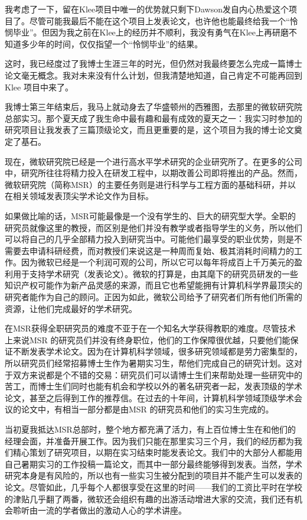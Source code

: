 \documentclass[letter,12pt]{book}
\begin{document}
\begin{CJK}{UTF8}{gbsn}
我考虑了一下，留在Klee项目中唯一的优势就只剩下Dawson发自内心热爱这个项目了。尽管可能我最后不能在这个项目上发表论文，也许他也能最终给我一个“怜悯毕业”。但因为我之前在Klee上的经历并不顺利，我没有勇气在Klee上再研磨不知道多少年的时间，仅仅指望一个“怜悯毕业”的结果。

这时，我已经度过了我博士生涯三年的时光，但仍然对我最终要怎么完成一篇博士论文毫无概念。我对未来没有什么计划，但我清楚地知道，自己肯定不可能再回到Klee 项目中来了。


我博士第三年结束后，我马上就动身去了华盛顿州的西雅图，去那里的微软研究院总部实习。那个夏天成了我生命中最有趣和最有成效的夏天之一：我实习时参加的研究项目让我发表了三篇顶级论文，而且更重要的是，这个项目为我的博士论文奠定了基石。

现在，微软研究院已经是一个进行高水平学术研究的企业研究所了。在更多的公司中，研究所往往将精力投入在研发工程中，以期改善公司即将推出的产品。然而，微软研究院（简称MSR）的主要任务则是进行科学与工程方面的基础科研，并以在相关领域发表顶尖学术论文作为目标。

如果做比喻的话，MSR可能最像是一个没有学生的、巨大的研究型大学。全职的研究员就像这里的教授，而区别是他们并没有教学或者指导学生的义务，所以他们可以将自己的几乎全部精力投入到研究当中。可能他们最享受的职业优势，则是不需要去申请科研经费，而对教授们来说这是一种周而复始、极其消耗时间精力的工作。因为微软已经是一个利润可观的公司，所以它可以每年将成百上千万美元的盈利用于支持学术研究（发表论文）。微软的打算是，由其麾下的研究员研发的一些知识产权可能作为新产品灵感的来源，而且它也希望能拥有计算机科学界最顶尖的研究者能作为自己的顾问。正因为如此，微软公司给予了研究者们所有他们所需的资源，让他们完成最好的学术研究。

在MSR获得全职研究员的难度不亚于在一个知名大学获得教职的难度。尽管技术上来说MSR 的研究员们并没有终身职位，他们的工作保障很优越，只要他们能保证不断发表学术论文。因为在计算机科学领域，很多研究领域都是劳力密集型的，所以研究员们经常招募博士生作为暑期实习生，帮他们完成自己的研究计划。这对于双方来说都是个不错的交易：研究员们可以请博士生们来帮助处理一些研究中的苦工，而博士生们同时也能有机会和学校以外的著名研究者一起，发表顶级的学术论文，甚至之后得到工作的推荐信。在过去的十年间，计算机科学领域顶级学术会议的论文中，有相当一部分都是由MSR 的研究员和他们的实习生完成的。

当初夏我抵达MSR总部时，整个地方都充满了活力，有上百位博士生在和他们的经理会面，并准备开展工作。因为我们只能在那里实习三个月，我们的经历都为我们精心策划了研究项目，以期在实习结束时能发表论文。我们中的大部分人都能用自己暑期实习的工作投稿一篇论文，而其中一部分最终能够得到发表。当然，学术研究本身是有风险的，所以也有一些实习生被分配到的项目并不能产生可以发表的论文。尽管如此，几乎每个人都很享受在这里的时间——我们的工资比平时在学校的津贴几乎翻了两番，微软还会组织有趣的出游活动增进大家的交流，我们还有机会聆听由一流的学者做出的激动人心的学术讲座。


\end{CJK}
\end{document}
